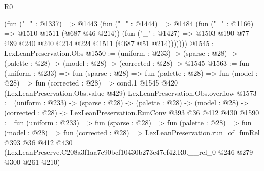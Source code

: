\begin{lexlean}{R0}
\begin{coremodule}
          (fun ("_" : @1337) =>
          @1443
            (fun ("_" : @1444) =>
            @1484
              (fun ("_" : @1166) => @1510 @1511 (@687 @46 @214))
              (fun ("_" : @1427) =>
              @1503 @190 @77 @89 @240 @240 @214 @224 @1511 (@687 @51 @214)))))))
@1545 := LexLeanPreservation.Obs
@1550 := (uniform : @233) ->
  (sparse : @28) -> (palette : @28) -> (model : @28) -> (corrected : @28) -> @1545
@1563 := fun (uniform : @233) =>
  fun (sparse : @28) =>
  fun (palette : @28) =>
  fun (model : @28) =>
  fun (corrected : @28) =>
  cond.{1} @1545 @420 (LexLeanPreservation.Obs.value @429) LexLeanPreservation.Obs.overflow
@1573 := (uniform : @233) ->
  (sparse : @28) ->
  (palette : @28) ->
  (model : @28) -> (corrected : @28) -> LexLeanPreservation.RunConv @393 @36 @412 @430
@1590 := fun (uniform : @233) =>
  fun (sparse : @28) =>
  fun (palette : @28) =>
  fun (model : @28) =>
  fun (corrected : @28) =>
  LexLeanPreservation.run_of_funRel
    @393
    @36
    @412
    @430
    (LexLeanPreserve.C208a3f1aa7c90bcf10430b273e47cf42.R0.__rel_0 @246 @279 @300 @261 @210)
\end{coremodule}
\end{lexlean}
